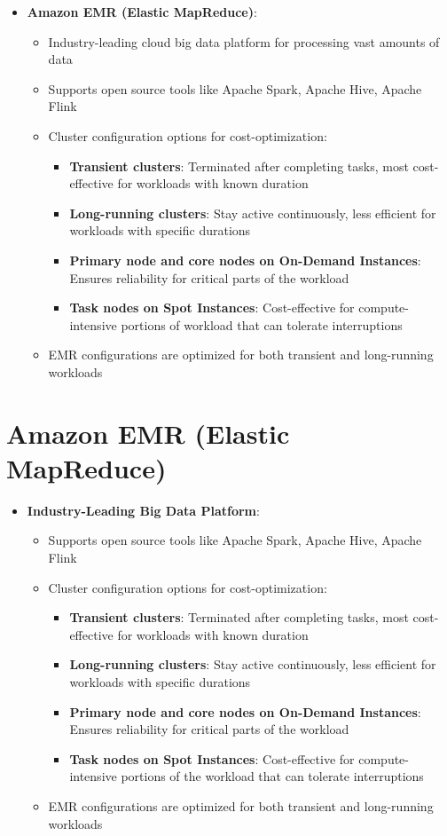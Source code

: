 \documentclass[11pt,a4paper]{report}
\begin{document}
\begin{itemize}
  \item \textbf{Amazon EMR (Elastic MapReduce)}:
\begin{itemize}
  \item Industry-leading cloud big data platform for processing vast amounts of data
  \item Supports open source tools like Apache Spark, Apache Hive, Apache Flink
  \item Cluster configuration options for cost-optimization:
\begin{itemize}
  \item \textbf{Transient clusters}: Terminated after completing tasks, most cost-effective for workloads with known duration
  \item \textbf{Long-running clusters}: Stay active continuously, less efficient for workloads with specific durations
  \item \textbf{Primary node and core nodes on On-Demand Instances}: Ensures reliability for critical parts of the workload
  \item \textbf{Task nodes on Spot Instances}: Cost-effective for compute-intensive portions of workload that can tolerate interruptions
\end{itemize}
  \item EMR configurations are optimized for both transient and long-running workloads
\end{itemize}
\end{itemize}


\section{Amazon EMR (Elastic MapReduce)}

\begin{itemize}
  \item \textbf{Industry-Leading Big Data Platform}:
\begin{itemize}
  \item Supports open source tools like Apache Spark, Apache Hive, Apache Flink
  \item Cluster configuration options for cost-optimization:
\begin{itemize}
  \item \textbf{Transient clusters}: Terminated after completing tasks, most cost-effective for workloads with known duration
  \item \textbf{Long-running clusters}: Stay active continuously, less efficient for workloads with specific durations
  \item \textbf{Primary node and core nodes on On-Demand Instances}: Ensures reliability for critical parts of the workload
  \item \textbf{Task nodes on Spot Instances}: Cost-effective for compute-intensive portions of the workload that can tolerate interruptions
\end{itemize}
  \item EMR configurations are optimized for both transient and long-running workloads
\end{itemize}
\end{itemize}
\end{document}
